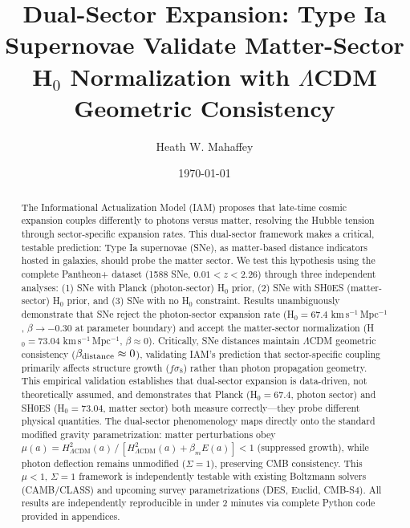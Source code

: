 \documentclass[twocolumn,superscriptaddress,prd,amsmath,amssymb]{revtex4-2}
\begin{document}
\title{Dual-Sector Expansion: Type Ia Supernovae Validate Matter-Sector H$_0$ Normalization with $\Lambda$CDM Geometric Consistency}

\author{Heath W. Mahaffey}

\date{\today}

\begin{abstract}
The Informational Actualization Model (IAM) proposes that late-time cosmic expansion couples differently to photons versus matter, resolving the Hubble tension through sector-specific expansion rates. This dual-sector framework makes a critical, testable prediction: Type Ia supernovae (SNe), as matter-based distance indicators hosted in galaxies, should probe the matter sector. We test this hypothesis using the complete Pantheon+ dataset (1588 SNe, $0.01 < z < 2.26$) through three independent analyses: (1) SNe with Planck (photon-sector) H$_0$ prior, (2) SNe with SH0ES (matter-sector) H$_0$ prior, and (3) SNe with no H$_0$ constraint. Results unambiguously demonstrate that SNe reject the photon-sector expansion rate (H$_0 = 67.4$ km\,s$^{-1}$\,Mpc$^{-1}$, $\beta \to -0.30$ at parameter boundary) and accept the matter-sector normalization (H$_0 = 73.04$ km\,s$^{-1}$\,Mpc$^{-1}$, $\beta \approx 0$). Critically, SNe distances maintain $\Lambda$CDM geometric consistency ($\beta_{\rm distance} \approx 0$), validating IAM's prediction that sector-specific coupling primarily affects structure growth ($f\sigma_8$) rather than photon propagation geometry. This empirical validation establishes that dual-sector expansion is data-driven, not theoretically assumed, and demonstrates that Planck (H$_0 = 67.4$, photon sector) and SH0ES (H$_0 = 73.04$, matter sector) both measure correctly—they probe different physical quantities. The dual-sector phenomenology maps directly onto the standard modified gravity parametrization: matter perturbations obey $\mu(a) = H^2_{\Lambda\text{CDM}}(a)\,/\,[H^2_{\Lambda\text{CDM}}(a) + \beta_m E(a)] < 1$ (suppressed growth), while photon deflection remains unmodified ($\Sigma = 1$), preserving CMB consistency. This $\mu < 1$, $\Sigma = 1$ framework is independently testable with existing Boltzmann solvers (CAMB/CLASS) and upcoming survey parametrizations (DES, Euclid, CMB-S4). All results are independently reproducible in under 2 minutes via complete Python code provided in appendices.
\end{abstract}

\maketitle
\end{document}
